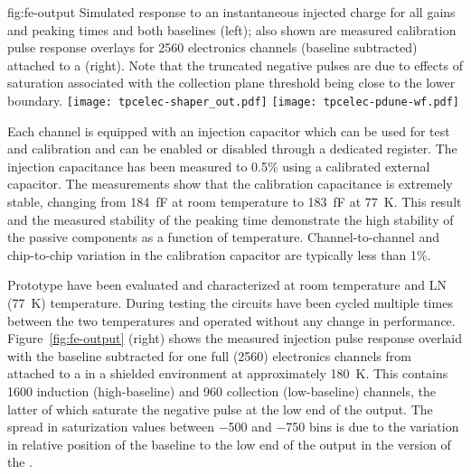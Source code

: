 \begin{dunefigure}
{fig:fe-output}
{Simulated  response to an instantaneous injected charge for all gains and peaking times and both baselines (left); also shown are measured calibration pulse response overlays for \num{2560} electronics channels (baseline subtracted) attached to a   (right).  Note that the truncated negative pulses are due to effects of saturation associated with the collection plane threshold being close to the lower  boundary.}
\texttt{[image: tpcelec-shaper\_out.pdf]}
\texttt{[image: tpcelec-pdune-wf.pdf]}
\end{dunefigure}

Each   channel is equipped with an injection capacitor which can be used
for test and calibration and can be enabled or disabled through a
dedicated register. The injection capacitance has been measured to \num{0.5}\% using 
a calibrated external capacitor. The measurements show
that the calibration capacitance is extremely stable, changing from
\SI{184}{fF} at room temperature to \SI{183}{fF} at \SI{77}{K}. This result and the measured
stability of the peaking time demonstrate the high stability of the
passive components as a function of temperature. Channel-to-channel and chip-to-chip
variation in the calibration capacitor are typically less than \num{1}\%. 

Prototype  have been evaluated and characterized at room temperature and LN 
(\SI{77}{K}) temperature.
During testing the circuits have been cycled multiple times
between the two temperatures and operated without any change in performance.
Figure~\ref{fig:fe-output} (right) shows the measured injection pulse response overlaid with the baseline subtracted for one full  
(\num{2560}) electronics channels from   attached to a   in a 
shielded environment at approximately \SI{180}{K}. This contains \num{1600} induction (high-baseline)
and \num{960} collection (low-baseline) channels, the latter of which saturate the negative pulse at the low 
end of the  output. The spread in saturization values between \num{-500} and \num{-750}  bins is due to the
variation in relative position of the  baseline to the low end of the  output 
in the  version of the .



